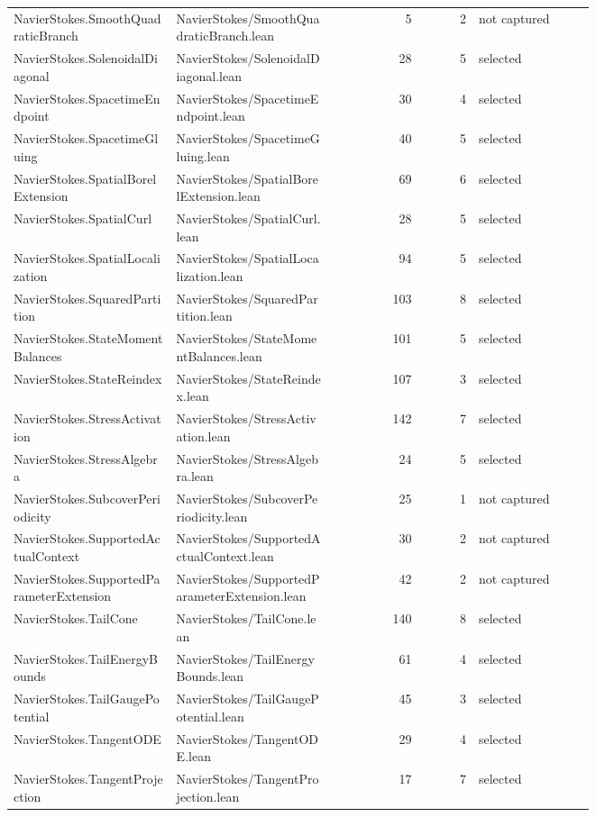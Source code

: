 \documentclass[10pt]{article}
\begin{document}
\begin{longtable}{p{0.28\linewidth}p{0.27\linewidth}r r p{0.20\linewidth}}
NavierStokes.SmoothQuadraticBranch & NavierStokes/SmoothQuadraticBranch.lean & 5 & 2 & not captured\\
NavierStokes.SolenoidalDiagonal & NavierStokes/SolenoidalDiagonal.lean & 28 & 5 & selected\\
NavierStokes.SpacetimeEndpoint & NavierStokes/SpacetimeEndpoint.lean & 30 & 4 & selected\\
NavierStokes.SpacetimeGluing & NavierStokes/SpacetimeGluing.lean & 40 & 5 & selected\\
NavierStokes.SpatialBorelExtension & NavierStokes/SpatialBorelExtension.lean & 69 & 6 & selected\\
NavierStokes.SpatialCurl & NavierStokes/SpatialCurl.lean & 28 & 5 & selected\\
NavierStokes.SpatialLocalization & NavierStokes/SpatialLocalization.lean & 94 & 5 & selected\\
NavierStokes.SquaredPartition & NavierStokes/SquaredPartition.lean & 103 & 8 & selected\\
NavierStokes.StateMomentBalances & NavierStokes/StateMomentBalances.lean & 101 & 5 & selected\\
NavierStokes.StateReindex & NavierStokes/StateReindex.lean & 107 & 3 & selected\\
NavierStokes.StressActivation & NavierStokes/StressActivation.lean & 142 & 7 & selected\\
NavierStokes.StressAlgebra & NavierStokes/StressAlgebra.lean & 24 & 5 & selected\\
NavierStokes.SubcoverPeriodicity & NavierStokes/SubcoverPeriodicity.lean & 25 & 1 & not captured\\
NavierStokes.SupportedActualContext & NavierStokes/SupportedActualContext.lean & 30 & 2 & not captured\\
NavierStokes.SupportedParameterExtension & NavierStokes/SupportedParameterExtension.lean & 42 & 2 & not captured\\
NavierStokes.TailCone & NavierStokes/TailCone.lean & 140 & 8 & selected\\
NavierStokes.TailEnergyBounds & NavierStokes/TailEnergyBounds.lean & 61 & 4 & selected\\
NavierStokes.TailGaugePotential & NavierStokes/TailGaugePotential.lean & 45 & 3 & selected\\
NavierStokes.TangentODE & NavierStokes/TangentODE.lean & 29 & 4 & selected\\
NavierStokes.TangentProjection & NavierStokes/TangentProjection.lean & 17 & 7 & selected\\

\end{longtable}
\end{document}
